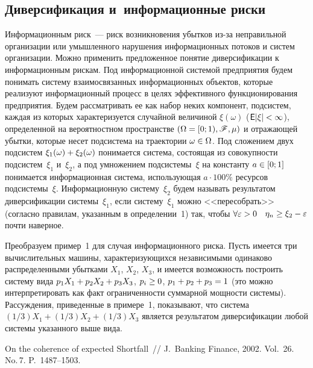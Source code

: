 \begin{multicols}{2}
\section{Диверсификация и~информационные риски}

Информационным риск~--- риск возникновения убытков из-за неправильной
организации или умышленного нарушения информационных потоков и
систем организации. Можно применить предложенное понятие
диверсификации к информационным рискам. Под информационной системой
предприятия будем понимать систему взаимосвязанных информационных
объектов, которые реализуют информационный процесс в целях
эффективного функционирования предприятия. Будем рассматривать ее
как набор неких компонент, подсистем, каждая из которых
характеризуется случайной величиной $\xi(\omega)$ ($\Expect|\xi|\hm<
\infty$), определенной на вероятностном пространстве
$(\Omega=[0;1),\mathscr{F},\mu)$ и отражающей убытки, которые несет
подсистема на траектории $\omega \hm\in \Omega$. Под сложением двух
подсистем $\xi_1(\omega)\hm+\xi_2(\omega)$ понимается система,
состоящая из совокупности подсистем~$\xi_1$ и~$\xi_2$, а под
умножением подсистемы~$\xi$ на константу $a\hm\in [0;1]$ понимается
информационная система, использующая $a\cdot 100\%$ ресурсов
подсистемы~$\xi$. Информационную систему~$\xi_2$ будем называть
результатом диверсификации системы~$\xi_1$, если систему~$\xi_1$
можно <<пересобрать>> (согласно правилам, указанным в определении~1)
так, чтобы $\forall \eps \hm> 0$ \  $\eta_n \hm\ge \xi_2 \hm- \eps$ почти
наверное.

Преобразуем пример~1 для случая информационного риска. Пусть имеется
три вычислительных машины, характеризующихся независимыми одинаково
распределенными убытками $X_1$, $X_2$, $X_3$, и имеется возможность
построить систему вида $p_1 X_1 \hm+ p_2 X_2 \hm+ p_3 X_3$, $p_i \hm\ge 0$,
$p_1\hm+p_2\hm+p_3\hm=1$ (это можно интерпретировать как факт огра\-ни\-чен\-ности
суммарной мощности системы). Рассуждения, приведенные в примере~1,
показывают, что система $(1/3) X_1 + (1/3) X_2 + (1/3) X_3$
является результатом диверсификации любой системы указанного выше
вида.


{\small\frenchspacing
{%
\begin{thebibliography}{9}


\label{end\stat}

 On the coherence of expected Shortfall~//
J.~Banking Finance, 2002. Vol.~26. No.\,7. P.~1487--1503.
 \end{thebibliography}
}
}


\end{multicols}       